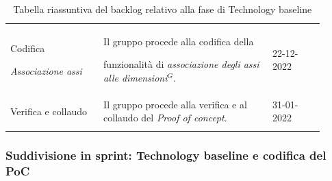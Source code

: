 {\begin{longtable}{p{0.27\linewidth}p{0.49\linewidth}p{0.15\linewidth}}
    \rowcolor[RGB]{216, 235, 171}
    Codifica \par \textit{Associazione assi} & Il gruppo procede alla codifica della \par funzionalità di \textit{associazione degli assi alle dimensioni$^{G}$}. & 22-12-2022\\

    \rowcolor[RGB]{233, 245, 206}
    Verifica e collaudo & Il gruppo procede alla verifica e al collaudo del \textit{Proof of concept}. & 31-01-2022\\

    \caption{Tabella riassuntiva del backlog relativo alla fase di Technology baseline}
\end{longtable}	
}

\subsubsection{Suddivisione in sprint: Technology baseline e codifica del PoC}
